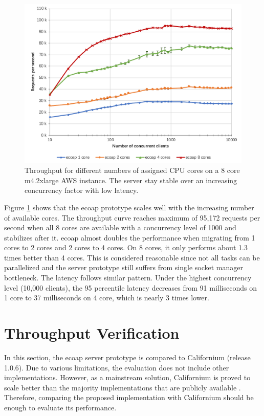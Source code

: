 \begin{figure}[!htbp]
\centering
\includegraphics[scale = 0.8]{vertical_scalability}
\caption[Throughput for different numbers of assigned CPU cores on a 8 core m4.2xlarge AWS instance]{Throughput for different numbers of assigned CPU cores on a 8 core m4.2xlarge AWS instance. The server stay stable over an increasing concurrency factor with low latency.}
\label{fig:scalability}
\end{figure}

Figure \ref{fig:scalability} shows that the ecoap prototype scales well with the increasing number of available cores. The throughput curve reaches maximum of 95,172 requests per second when all 8 cores are available with a concurrency level of 1000 and stabilizes after it. ecoap almost doubles the performance when migrating from 1 cores to 2 cores and 2 cores to 4 cores. On 8 cores, it only performs about 1.3 times better than 4 cores. This is considered reasonable since not all tasks can be parallelized and the server prototype still suffers from single socket manager bottleneck. The latency follows similar pattern. Under the highest concurrency level (10,000 clients), the 95 percentile latency decreases from 91 milliseconds on 1 core to 37 milliseconds on 4 core, which is nearly 3 times lower.

\section{Throughput Verification}

In this section, the ecoap server prototype is compared to Californium (release 1.0.6). Due to various limitations, the evaluation does not include other implementations. However, as a mainstream solution, Californium is proved to scale better than the majority implementations that are publicly available \cite{lanter2013scalability}\cite{kovatsch2014californium}\cite{kovatsch2015scalable}. Therefore, comparing the proposed implementation with Californium should be enough to evaluate its performance. 

